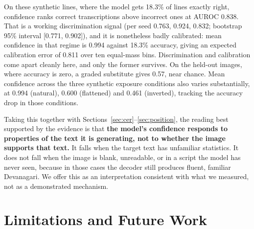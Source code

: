 \documentclass{article}
\begin{document}
On these synthetic lines, where the model gets 18.3\% of lines exactly right, confidence ranks
correct transcriptions above incorrect ones at AUROC 0.838.
That is a working discrimination signal (per seed 0.763, 0.924, 0.832; bootstrap 95\% interval
[0.771, 0.902]), and it is nonetheless badly calibrated: mean confidence in that regime is 0.994
against 18.3\% accuracy, giving an expected calibration error of 0.811 over ten equal-mass
bins. Discrimination and calibration
come apart cleanly here, and only the former survives. On the held-out images, where accuracy is
zero, a graded substitute gives 0.57, near chance. Mean confidence across the three synthetic
exposure conditions also varies substantially, at 0.994 (natural), 0.600 (flattened) and 0.461
(inverted), tracking the accuracy drop in those conditions.

Taking this together with Sections~\ref{sec:cer}--\ref{sec:position}, the reading best
supported by the evidence is that \textbf{the model's confidence responds to properties of the
text it is generating, not to whether the image supports that text.} It falls when the target
text has unfamiliar statistics. It does not fall when the image is blank, unreadable, or in a
script the model has never seen, because in those cases the decoder still produces fluent,
familiar Devanagari. We offer this as an interpretation consistent with what we measured, not
as a demonstrated mechanism.

\section{Limitations and Future Work}
\label{sec:lim}
\end{document}
